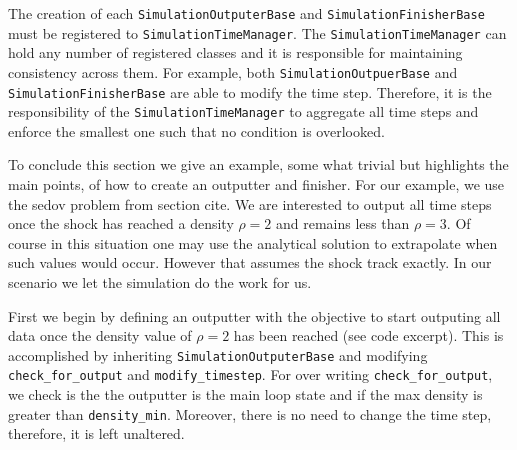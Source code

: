 The creation of each \lstinline{SimulationOutputerBase} and \lstinline{SimulationFinisherBase}
must be registered to \lstinline{SimulationTimeManager}. The \lstinline{SimulationTimeManager}
can hold any number of registered classes and it is responsible for maintaining consistency 
across them. For example, both \lstinline{SimulationOutpuerBase} and 
\lstinline{SimulationFinisherBase} are able to modify the time step. Therefore, it is
the responsibility of the \lstinline{SimulationTimeManager} to aggregate all time steps
and enforce the smallest one such that no condition is overlooked.

To conclude this section we give an example, some what trivial but highlights the main points, of
how to create an outputter and finisher. For our example, we use the sedov problem from 
section cite. We are interested to output all time steps once the shock has reached
a density $\rho=2$ and remains less than $\rho=3$. Of course in this situation one may
use the analytical solution to extrapolate when such values would occur. However that
assumes the shock track exactly. In our scenario we let the simulation do the work
for us.

First we begin by defining an outputter with the objective to start outputing
all data once the density value of $\rho=2$ has been reached (see code excerpt). This
is accomplished by inheriting \lstinline{SimulationOutputerBase} and modifying
\lstinline{check_for_output} and \lstinline{modify_timestep}. For over writing
\lstinline{check_for_output}, we check is the the outputter is the main loop state
and if the max density is greater than \lstinline{density_min}. Moreover, there
is no need to change the time step, therefore, it is left unaltered.


